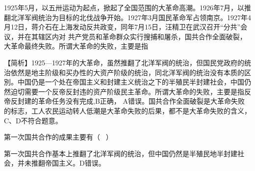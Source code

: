 \question 1925年5月，以五卅运动为起点，掀起了全国范围的大革命高潮。1926年7月，以推翻北洋军阀统治为目标的北伐战争开始。1927年3月国民革命军占领南京。1927年4月12日，蒋介石在上海发动反共政变，同年7月15日，汪精卫在武汉召开``分共''会议，并在其辖区内对
共产党员和革命群众实行搜捕和屠杀，国共合作全面破裂，大革命最终失败。所谓大革命的失败，主要是指
\par{}
\begin{solution}【简析】1925---1927年的大革命，虽然推翻了北洋军阀的统治，但国民党政府的统治依然是地主阶级和买办性的大资产阶级的统治，同北洋军阀的统治没有本质的区別。中国仍是一个处在帝国主义和封建主义统治之下的半殖民半封建社会，中国仍然迫切需要一个反帝反封违的资产阶级民主革命。所谓大革命的失败，主要是指反帝反封建的革命任务没有完成,B正确，
A错误。国共合作全面破裂是大革命失败的标志，工人农民运动转人低潮是大革命失败的后果，都不是大革命失败的含义，
C、D不符合题意。
\end{solution}
\question 第一次国共合作的成果主要有（ ~）
\par{}
\begin{solution}第一次国共合作基本上推翻了北洋军阀的统治，但中国仍然是半殖民地半封建社会，并未推翻帝国主义。D错误。
\end{solution}
